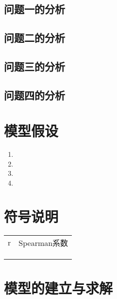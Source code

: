 \documentclass[a4paper]{article}
\begin{document}
	\subsection{问题一的分析}
	\subsection{问题二的分析}
	\subsection{问题三的分析}
	\subsection{问题四的分析}
	
	\section{模型假设}
	\begin{enumerate} 
		\item 
		\item 
		\item 
		\item 
	\end{enumerate}
	
	\section{符号说明}
	\begin{table}[H] %
		\captionsetup{skip=4pt} %
		\centering
		\setlength{\arrayrulewidth}{2pt} %
		\begin{tabular}{cc} %
			\hline
			\makebox[0.15\textwidth][c]{符号} & \makebox[0.6\textwidth][c]{说明}  \\ 
			\hline
			r & Spearman系数  \\
			 &   \\
			 &   \\
			 &   \\
			\hline
		\end{tabular}
	\end{table}
	
	
	\section{模型的建立与求解}
\end{document}
